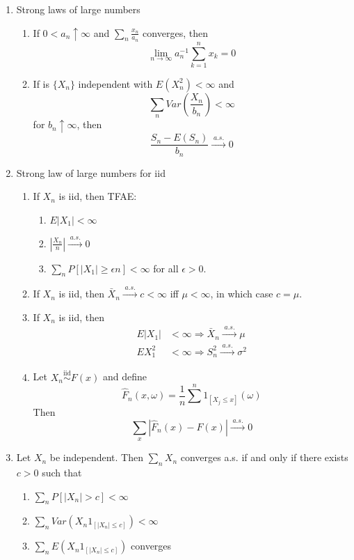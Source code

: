 \documentclass{article}
\newcommand{\as}{\;a.s.\;}
\newcommand{\asto}{\overset{\as}{\to}}
\newcommand{\iid}{\overset{\text{iid}}{\sim}}
\begin{document}
\begin{enumerate}
\begin{enumerate}
  \end{enumerate}
\item Strong laws of large numbers
  \begin{enumerate}
    \item If $0 < a_n \uparrow \infty$ and $\sum_n \frac{x_n}{a_n}$ converges, then
      \[
        \lim_{n \to \infty} a_n^{-1} \sum_{k=1}^n x_k = 0
      \]
    \item If is $\{X_n\}$ independent with $E(X_n^2) < \infty$ and 
      \[
        \sum_n Var(\frac{X_n}{b_n}) < \infty
      \]
      for $b_n \uparrow \infty$, then
      \[
        \frac{S_n - E(S_n)}{b_n} \asto 0
      \]
  \end{enumerate}
\item Strong law of large numbers for iid
  \begin{enumerate}
  \item If $X_n$ is iid, then TFAE:
    \begin{enumerate}
    \item $E|X_1| < \infty$
    \item $|\frac{X_n}{n}| \asto 0$
    \item $\sum_n P[|X_1| \geq \epsilon n] < \infty$ for all $\epsilon > 0$.
    \end{enumerate}
    \item If $X_n$ is iid, then $\bar{X}_n \asto c < \infty$ iff $\mu < \infty$, in which case $c = \mu$.
    \item If $X_n$ is iid, then
      \begin{align*}
        E|X_1| & < \infty \Rightarrow \bar{X}_n \asto \mu \\
        EX_1^2 & < \infty \Rightarrow S_n^2 \asto \sigma^2
      \end{align*}
    \item Let $X_n \iid F(x)$ and define
      \[
        \hat{F}_n(x,\omega) = \frac{1}{n} \sum^n 1_{[X_j \leq x]}(\omega)
      \]
      Then
      \[
        \sum_x |\hat{F}_n(x) - F(x)| \asto 0
      \]
    \end{enumerate}
  \item Let $X_n$ be independent. Then $\sum_n X_n$ converges a.s. if and only if there exists $c > 0$ such that
    \begin{enumerate}
    \item $\sum_n P[|X_n| >c] < \infty$
    \item $\sum_n Var(X_n 1_{[|X_n| \leq c]}) < \infty$
    \item $\sum_n E(X_n 1_{[|X_n| \leq c]})$ converges
  \end{enumerate}
\end{enumerate}
\end{document}
